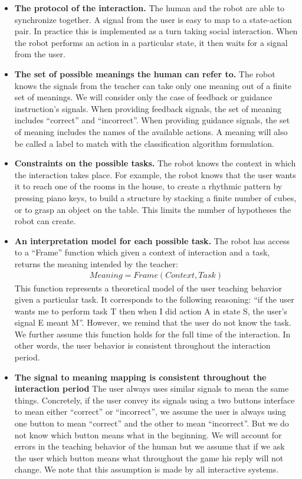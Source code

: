 \begin{itemize}

\item \textbf{The protocol of the interaction.} The human and the robot are able to synchronize together. A signal from the user is easy to map to a state-action pair. In practice this is implemented as a turn taking social interaction. When the robot performs an action in a particular state, it then waits for a signal from the user.

\item \textbf{The set of possible meanings the human can refer to.} The robot knows the signals from the teacher can take only one meaning out of a finite set of meanings. We will consider only the case of feedback or guidance instruction's signals. When providing feedback signals, the set of meaning includes ``correct'' and ``incorrect''. When providing guidance signals, the set of meaning includes the names of the available actions. A meaning will also be called a label to match with the classification algorithm formulation. 

\item \textbf{Constraints on the possible tasks.} The robot knows the context in which the interaction takes place. For example, the robot knows that the user wants it to reach one of the rooms in the house, to create a rhythmic pattern by pressing piano keys, to build a structure by stacking a finite number of cubes, or to grasp an object on the table. This limits the number of hypotheses the robot can create.

\item \textbf{An interpretation model for each possible task.} The robot has access to a ``Frame'' function which given a context of interaction and a task, returns the meaning intended by the teacher:
%
\begin{eqnarray}
Meaning = Frame(Context, Task) \nonumber
\end{eqnarray}
%
This function represents a theoretical model of the user teaching behavior given a particular task. It corresponds to the following reasoning: ``if the user wants me to perform task T then when I did action A in state S, the user's signal E meant M''. However, we remind that the user do not know the task. We further assume this function holds for the full time of the interaction. In other words, the user behavior is consistent throughout the interaction period.

\item \textbf{The signal to meaning mapping is consistent throughout the interaction period} The user always uses similar signals to mean the same things. Concretely, if the user convey its signals using a two buttons interface to mean either ``correct'' or ``incorrect'', we assume the user is always using one button to mean ``correct'' and the other to mean ``incorrect''. But we do not know which button means what in the beginning. We will account for errors in the teaching behavior of the human but we assume that if we ask the user which button means what throughout the game his reply will not change. We note that this assumption is made by all interactive systems.


\end{itemize}
